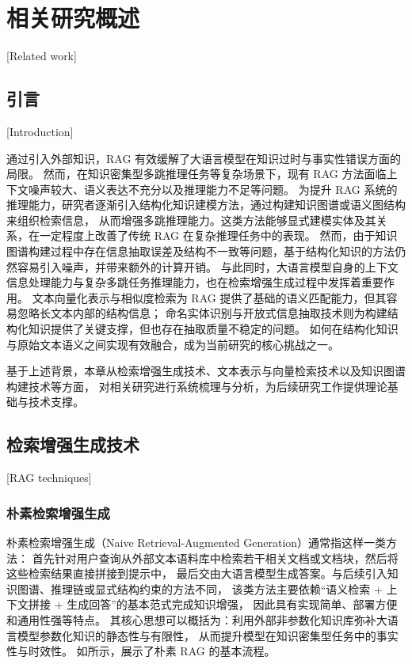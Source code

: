 
\chapter{相关研究概述}[Related work]

\section{引言}[Introduction]

通过引入外部知识，RAG 有效缓解了大语言模型在知识过时与事实性错误方面的局限。
然而，在知识密集型多跳推理任务等复杂场景下，现有 RAG 方法面临上下文噪声较大、语义表达不充分以及推理能力不足等问题。
为提升 RAG 系统的推理能力，研究者逐渐引入结构化知识建模方法，通过构建知识图谱或语义图结构来组织检索信息，
从而增强多跳推理能力。这类方法能够显式建模实体及其关系，在一定程度上改善了传统 RAG 在复杂推理任务中的表现。
然而，由于知识图谱构建过程中存在信息抽取误差及结构不一致等问题，基于结构化知识的方法仍然容易引入噪声，并带来额外的计算开销。
与此同时，大语言模型自身的上下文信息处理能力与复杂多跳任务推理能力，也在检索增强生成过程中发挥着重要作用。
文本向量化表示与相似度检索为 RAG 提供了基础的语义匹配能力，但其容易忽略长文本内部的结构信息；
命名实体识别与开放式信息抽取技术则为构建结构化知识提供了关键支撑，但也存在抽取质量不稳定的问题。
如何在结构化知识与原始文本语义之间实现有效融合，成为当前研究的核心挑战之一。

基于上述背景，本章从检索增强生成技术、文本表示与向量检索技术以及知识图谱构建技术等方面，
对相关研究进行系统梳理与分析，为后续研究工作提供理论基础与技术支撑。

\section{检索增强生成技术}[RAG techniques]

\subsection{朴素检索增强生成}

朴素检索增强生成（Naive Retrieval-Augmented Generation）通常指这样一类方法：
首先针对用户查询从外部文本语料库中检索若干相关文档或文档块，然后将这些检索结果直接拼接到提示中，
最后交由大语言模型生成答案。与后续引入知识图谱、推理链或显式结构约束的方法不同，
该类方法主要依赖“语义检索 + 上下文拼接 + 生成回答”的基本范式完成知识增强，
因此具有实现简单、部署方便和通用性强等特点。
其核心思想可以概括为：利用外部非参数化知识库弥补大语言模型参数化知识的静态性与有限性，
从而提升模型在知识密集型任务中的事实性与时效性。
如所示，展示了朴素 RAG 的基本流程。

